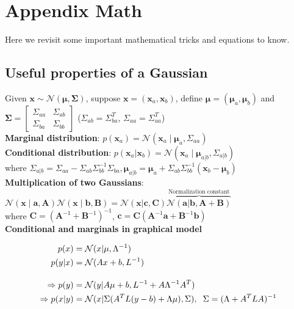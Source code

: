 \section{Appendix Math}
Here we revisit some important mathematical tricks and equations to know.  
\subsection{Useful properties of a Gaussian}
Given $\bm{x}\sim \mathcal{N}(\bm{\mu}, \bm{\Sigma})$, suppose $\bm{x}=(\bm{x}_a, \bm{x}_b)$, define $\bm{\mu}=(\bm{\mu}_a, \bm{\mu}_b)$ and $\bm{\Sigma} = \begin{bmatrix}
\Sigma_{aa} & \Sigma_{ab}\\ \Sigma_{ba} & \Sigma_{bb}
\end{bmatrix}$ ($\Sigma_{ab}=\Sigma_{ba}^T$, $\Sigma_{aa}=\Sigma_{aa}^T$)\\

\textbf{Marginal distribution}: $p(\bm{x}_a) = \mathcal{N}(\bm{x}_a\mid \bm{\mu}_a, \Sigma_{aa})$\\

\textbf{Conditional distribution}: $p(\bm{x}_a\vert \bm{x}_b) = \mathcal{N}(\bm{x}_a\mid \bm{\mu}_{a|b}, \Sigma_{a|b})$\\ where $\Sigma_{a|b} = \Sigma_{aa} - \Sigma_{ab}\Sigma_{bb}^{-1}\Sigma_{ba}, \bm{\mu}_{a\vert b} = \bm{\mu}_a + \Sigma_{ab}\Sigma_{bb}^{-1}\left(\bm{x}_{b}-\bm{\mu}_{b}\right)$\\[10pt]

\textbf{Multiplication of two Gaussians}: $\mathcal{N}(\bm{x}\mid \bm{a}, \bm{A})\mathcal{N}(\bm{x}\mid\bm{b}, \bm{B})=\mathcal{N}(\bm{x}|\bm{c}, \bm{C})\overbrace{\mathcal{N}(\bm{a}|\bm{b}, \bm{A}+\bm{B})}^{\text{Normalization constant}}$\\ where $\bm{C}=\left(\bm{A}^{-1}+\bm{B}^{-1}\right)^{-1}$, $\bm{c}=\bm{C}\left(\bm{A}^{-1}\bm{a}+\bm{B}^{-1}\bm{b}\right)$\\

\textbf{Conditional and marginals in graphical model}\\
\begin{wrapfigure}[3]{l}{0.1\textwidth}
	\centering
\end{wrapfigure}
\begin{equation*}
	\begin{split}
		p(x) & = \mathcal{N}(x|\mu, \Lambda^{-1})\\
		p(y|x) & = \mathcal{N}(Ax+b, L^{-1})\\[10pt]
		\Rightarrow p(y) & = \mathcal{N}(y|A\mu + b, L^{-1} + A\Lambda^{-1}A^T)\\
		\Rightarrow p(x|y) & = \mathcal{N}(x|\Sigma(A^T L (y - b) + \Lambda\mu), \Sigma), \hspace{2mm} \Sigma=(\Lambda + A^T L A)^{-1}
	\end{split}
\end{equation*}


